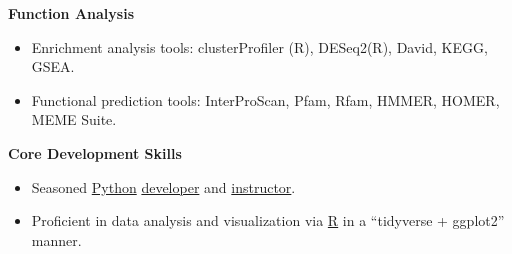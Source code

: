 \textbf{Function Analysis}
\begin{itemize}
    \item Enrichment analysis tools: clusterProfiler (R), DESeq2(R), David, KEGG, GSEA.
    \item Functional prediction tools: InterProScan, Pfam, Rfam, HMMER, HOMER, MEME Suite.
\end{itemize}


\textbf{Core Development Skills}\\

\begin{itemize}
    \item Seasoned \underline{Python} \href{https://github.com/hermanzhaozzzz}{developer} and \href{https://www.bioinfo.info/p/t_pc/goods_pc_detail/goods_detail/course_2SvfNlIVzrKfOcexHk9Nute5Bhd}{instructor}.
    \item Proficient in data analysis and visualization via \underline{R} in a ``tidyverse + ggplot2'' manner.
\end{itemize}
  
  
  
